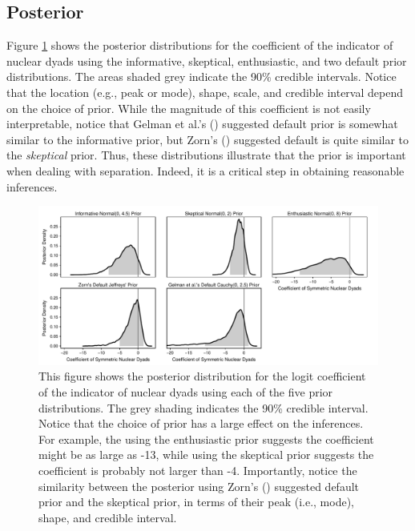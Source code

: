 \documentclass[12pt]{article}
\begin{document}
\subsection*{Posterior}

Figure \ref{fig:bm-posterior-density} shows the posterior distributions for the coefficient of the indicator of nuclear dyads using the informative, skeptical, enthusiastic, and two default prior distributions. 
The areas shaded grey indicate the 90\% credible intervals. Notice that the location (e.g., peak or mode), shape, scale, and credible interval depend on the choice of prior. 
While the magnitude of this coefficient is not easily interpretable, notice that Gelman et al.'s (\citeyear{Gelmanetal2008}) suggested default prior is somewhat similar to the informative prior, but Zorn's (\citeyear{Zorn2005}) suggested default is quite similar to the \emph{skeptical} prior. 
Thus, these distributions illustrate that the prior is important when dealing with separation. 
Indeed, it is a critical step in obtaining reasonable inferences.

\begin{figure}[H]
\begin{center}
\includegraphics[scale = .8]{figs/bm-posterior-density.pdf}
\caption{This figure shows the posterior distribution for the logit coefficient of the indicator of nuclear dyads using each of the five prior distributions.  
The grey shading indicates the 90\% credible interval. 
Notice that the choice of prior has a large effect on the inferences. 
For example, the using the enthusiastic prior suggests the coefficient might be as large as -13, while using the skeptical prior suggests the coefficient is probably not larger than -4. 
Importantly, notice the similarity between the posterior using Zorn's (\citeyear{Zorn2005}) suggested default prior and the skeptical prior, in terms of their peak (i.e., mode), shape, and credible interval.}\label{fig:bm-posterior-density}
\end{center}
\end{figure}
\end{document}
